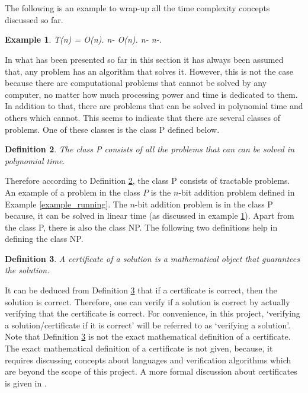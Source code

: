 \documentclass{article}
\newtheorem{definition}{Definition}[subsection]
\newtheorem{example}[definition]{Example}
\begin{document}
\\\\The following is an example to wrap-up all the time complexity concepts discussed so far.
\begin{example}
\label{time_complexity_example}
{} T(n) = O(n). {} n-{} O(n). {} n-{} n-{}.
\end{example}
In what has been presented so far in this section it has always been assumed that, any problem has an algorithm that solves it. However, this is not the case because there are computational problems that cannot be solved by any computer, no matter how much processing power and time is dedicated to them. In addition to that, there are problems that can be solved in polynomial time and others which cannot. This seems to indicate that there are several classes of problems. One of these classes is the class P defined below. \cite{cormen_leiserson_rivest_stein}
\begin{definition}
\label{P}
The class P consists of all the problems that can can be solved in polynomial time. {}
\end{definition}
Therefore according to Definition \ref{P}, the class P consists of tractable problems. An example of a problem in the class $\mathit{P}$ is the $\mathit{n}$-bit addition problem defined in Example \ref{example_running}. The $\mathit{n}$-bit addition problem is in the class P because, it can be solved in linear time (as discussed in example \ref{time_complexity_example}). Apart from the class P, there is also the class NP. The following two definitions help in defining the class NP.
\begin{definition}
\label{certificate}
A certificate of a solution is a mathematical object that guarantees the solution. {}
\end{definition}
It can be deduced from Definition \ref{certificate} that if a certificate is correct, then the solution is correct. Therefore, one can verify if a solution is correct by actually verifying that the certificate is correct. For convenience, in this project, `verifying a solution/certificate if it is correct' will be referred to as `verifying a solution'. Note that Definition \ref{certificate} is not the exact mathematical definition of a certificate. The exact mathematical definition of a certificate is not given, because, it requires discussing concepts about languages and verification algorithms which are beyond the scope of this project. A more formal discussion about certificates is given in \cite{cormen_leiserson_rivest_stein}.
\end{document}
